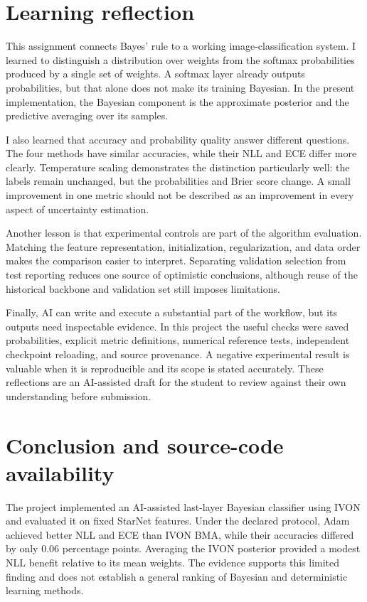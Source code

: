 \documentclass[11pt,a4paper]{article}
\begin{document}
\section{Learning reflection}
This assignment connects Bayes' rule to a working image-classification system.
I learned to distinguish a distribution over weights from the softmax probabilities
produced by a single set of weights. A softmax layer already outputs probabilities,
but that alone does not make its training Bayesian. In the present implementation,
the Bayesian component is the approximate posterior and the predictive averaging
over its samples.

I also learned that accuracy and probability quality answer different questions.
The four methods have similar accuracies, while their NLL and ECE differ more
clearly. Temperature scaling demonstrates the distinction particularly well:
the labels remain unchanged, but the probabilities and Brier score change.
A small improvement in one metric should not be described as an improvement
in every aspect of uncertainty estimation.

Another lesson is that experimental controls are part of the algorithm evaluation.
Matching the feature representation, initialization, regularization, and data order
makes the comparison easier to interpret. Separating validation selection from
test reporting reduces one source of optimistic conclusions, although reuse of
the historical backbone and validation set still imposes limitations.

Finally, AI can write and execute a substantial part of the workflow, but its
outputs need inspectable evidence. In this project the useful checks were saved
probabilities, explicit metric definitions, numerical reference tests, independent
checkpoint reloading, and source provenance. A negative experimental result is
valuable when it is reproducible and its scope is stated accurately. These
reflections are an AI-assisted draft for the student to review against their
own understanding before submission.

\section{Conclusion and source-code availability}
The project implemented an AI-assisted last-layer Bayesian classifier using
IVON and evaluated it on fixed StarNet features. Under the declared protocol,
Adam achieved better NLL and ECE than IVON BMA, while their accuracies differed
by only 0.06 percentage points. Averaging the IVON posterior provided a modest
NLL benefit relative to its mean weights. The evidence supports this limited
finding and does not establish a general ranking of Bayesian and deterministic
learning methods.
\end{document}
